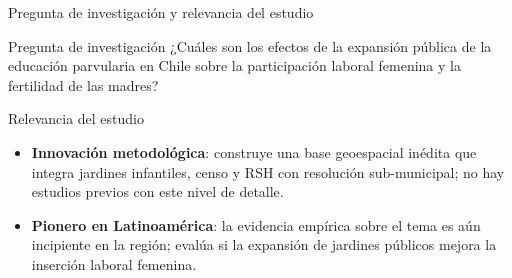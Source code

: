 \documentclass[aspectratio=169,10pt]{beamer}
\begin{document}
\begin{frame}{Pregunta de investigación y relevancia del estudio}
\begin{block}{Pregunta de investigación}
\small ¿Cuáles son los efectos de la expansión pública de la educación parvularia en Chile sobre la participación laboral femenina y la fertilidad de las madres?
\end{block}

\vspace{6pt}
\begin{block}{Relevancia del estudio}
\begingroup
{}
\begin{itemize}
  \small
  \item \textbf{Innovación metodológica}: construye una base geoespacial inédita que integra jardines infantiles, censo y RSH con resolución sub-municipal; no hay estudios previos con este nivel de detalle.
  \item \textbf{Pionero en Latinoamérica}: la evidencia empírica sobre el tema es aún incipiente en la región; evalúa si la expansión de jardines públicos mejora la inserción laboral femenina.
\end{itemize}
\endgroup
\end{block}
\end{frame}
\end{document}
